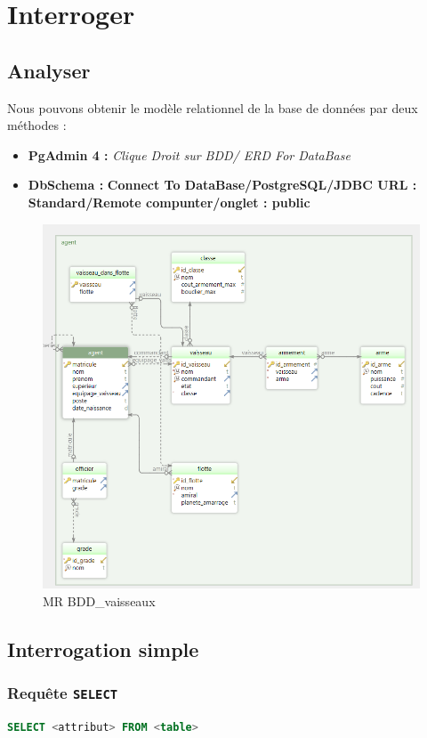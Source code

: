 \chapter{Interroger}
\minitoc

\section{Analyser}

Nous pouvons obtenir le modèle relationnel de la base de données par deux méthodes :

\begin{itemize}
    \item \textbf{PgAdmin 4 :} \textit{Clique Droit sur BDD/ ERD For DataBase}
    \item \textbf{DbSchema : } \textbf{Connect To DataBase/PostgreSQL/JDBC URL : Standard/Remote compunter/onglet : public}
\end{itemize}

\begin{figure} [H]
    \centering
    \includegraphics[width=0.8\linewidth]{image/MR_Seq4.png}
    \caption{MR BDD\_vaisseaux}
    \label{fig:enter-label}
\end{figure}


\section{Interrogation simple}

\subsection{Requête \texttt{SELECT}}
\begin{lstlisting}[language=SQL]
SELECT <attribut> FROM <table>
\end{lstlisting}


